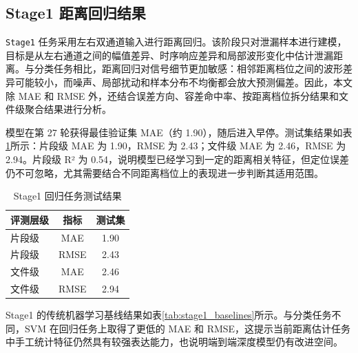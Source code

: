 \subsection{Stage1 距离回归结果}

\texttt{Stage1} 任务采用左右双通道输入进行距离回归。该阶段只对泄漏样本进行建模，目标是从左右通道之间的幅值差异、时序响应差异和局部波形变化中估计泄漏距离。与分类任务相比，距离回归对信号细节更加敏感：相邻距离档位之间的波形差异可能较小，而噪声、局部扰动和样本分布不均衡都会放大预测偏差。因此，本文除 MAE 和 RMSE 外，还结合误差方向、容差命中率、按距离档位拆分结果和文件级聚合结果进行分析。

模型在第 27 轮获得最佳验证集 MAE（约 1.90），随后进入早停。测试集结果如表\ref{tab:stage1_results}所示：片段级 MAE 为 1.90，RMSE 为 2.43；文件级 MAE 为 2.46，RMSE 为 2.94。片段级 R² 为 0.54，说明模型已经学习到一定的距离相关特征，但定位误差仍不可忽略，尤其需要结合不同距离档位上的表现进一步判断其适用范围。

\begin{table}[!htbp]
  \centering
  \caption{Stage1 回归任务测试结果}
  \label{tab:stage1_results}
  \vspace{0.5em}
  \wuhao
  \begin{tabular}{lcc}
    \toprule
    评测层级 & 指标 & 测试集 \\
    \midrule
    片段级 & MAE & 1.90 \\
    片段级 & RMSE & 2.43 \\
    文件级 & MAE & 2.46 \\
    文件级 & RMSE & 2.94 \\
    \bottomrule
  \end{tabular}
\end{table}

Stage1 的传统机器学习基线结果如表\ref{tab:stage1_baselines}所示。与分类任务不同，SVM 在回归任务上取得了更低的 MAE 和 RMSE，这提示当前距离估计任务中手工统计特征仍然具有较强表达能力，也说明端到端深度模型仍有改进空间。

\begin{table}[!htbp]
  \centering
  \caption{Stage1 回归任务传统基线对比}
  \label{tab:stage1_baselines}
  \vspace{0.5em}
  \wuhao
\end{table}

